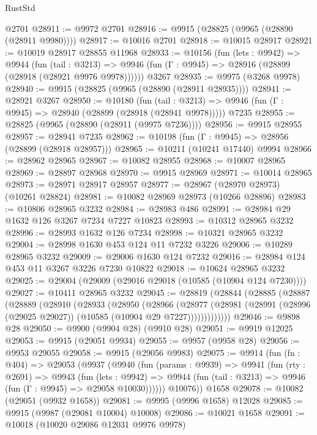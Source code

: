 \begin{lexlean}{RustStd}
\begin{coremodule}
{\begin{coremodule}
{{{{{{{{{{{{{{{{{{{{{{{{{    @2701
@28911 := @9972 @2701
@28916 := @9915 (@28825 (@9965 (@28890 (@28911 @9980))))
@28917 := @10016 @2701
@28918 := @10015 @28917
@28921 := @10019 @28917 @28855 @11968
@28933 := @10156
    (fun (lets : @9942) =>
    @9944
      (fun (tail : @3213) =>
      @9946 (fun (Γ : @9945) => @28916 (@28899 (@28918 (@28921 @9976 @9978))))))
    @3267
@28935 := @9975 (@3268 @9978)
@28940 := @9915 (@28825 (@9965 (@28890 (@28911 @28935))))
@28941 := @28921 @3267
@28950 := @10180
    (fun (tail : @3213) => @9946 (fun (Γ : @9945) => @28940 (@28899 (@28918 (@28941 @9978)))))
    @7235
@28955 := @28825 (@9965 (@28890 (@28911 (@9975 @7236))))
@28956 := @9915 @28955
@28957 := @28941 @7235
@28962 := @10198 (fun (Γ : @9945) => @28956 (@28899 (@28918 @28957)))
@28965 := @10211 (@10241 @17440) @9994
@28966 := @28962 @28965
@28967 := @10082 @28955
@28968 := @10007 @28965
@28969 := @28897 @28968
@28970 := @9915 @28969
@28971 := @10014 @28965
@28973 := @28971 @28917 @28957
@28977 := @28967 (@28970 @28973) (@10261 @28824)
@28981 := @10082 @28969 @28973 (@10266 @28896)
@28983 := @10806 @28965 @3232
@28984 := @28983 @486
@28991 := @28984 @29 @1632 @126 @3267 @7234 @7227 @10823
@28993 := @10312 @28965 @3232
@28996 := @28993 @1632 @126 @7234
@28998 := @10321 @28965 @3232
@29004 := @28998 @1630 @453 @124 @11 @7232 @3226
@29006 := @10289 @28965 @3232
@29009 := @29006 @1630 @124 @7232
@29016 := @28984 @124 @453 @11 @3267 @3226 @7230 @10822
@29018 := @10624 @28965 @3232
@29025 := @29004 (@29009 (@29016 @29018 (@10585 (@10904 @124 @7230))))
@29027 := @10411 @28965 @3232
@29045 := @28819
    (@28844
      (@28885
        (@28887
          (@28889
            (@28910
              (@28933
                (@28950
                  (@28966
                    (@28977
                      (@28981
                        (@28991 (@28996 (@29025 @29027)) (@10585 (@10904 @29 @7227)))))))))))))
@29046 := @9898 @28
@29050 := @9900 (@9904 @28) (@9910 @28)
@29051 := @9919 @12025
@29053 := @9915 (@29051 @9934)
@29055 := @9957 (@9958 @28)
@29056 := @9953 @29055
@29058 := @9915 (@29056 @9983)
@29075 := @9914
    (fun (fn : @404) =>
    @29053
      (@9937
        (@9940
          (fun (params : @9939) =>
          @9941
            (fun (rty : @2691) =>
            @9943
              (fun (lets : @9942) =>
              @9944 (fun (tail : @3213) => @9946 (fun (Γ : @9945) => @29058 @10030))))))
        @10076))
    @1658
@29078 := @10082 (@29051 (@9932 @1658))
@29081 := @9995 (@9996 @1658) @12028
@29085 := @9915 (@9987 (@29081 @10004) @10008)
@29086 := @10021 @1658
@29091 := @10018 (@10020 @29086 @12031 @9976 @9978)
}}}}}}}}}}}}}}}}}}}}}}}}}
\end{coremodule}}
\end{coremodule}
\end{lexlean}
